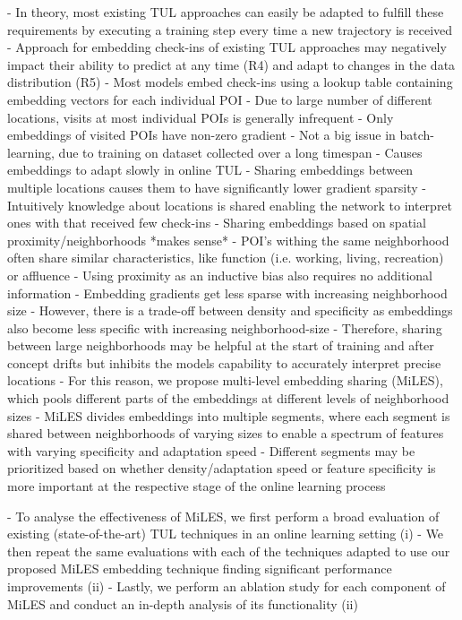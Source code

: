 \documentclass{article} %
\theoremstyle{definition}
\begin{document}
- In theory, most existing TUL approaches can easily be adapted to fulfill these requirements by executing a training step every time a new trajectory is received
- Approach for embedding check-ins of existing TUL approaches may negatively impact their ability to predict at any time (R4) and adapt to changes in the data distribution (R5)
- Most models embed check-ins using a lookup table containing embedding vectors for each individual POI
- Due to large number of different locations, visits at most individual POIs is generally infrequent \citep{chenMutualDistillationLearning2022a}
- Only embeddings of visited POIs have non-zero gradient
- Not a big issue in batch-learning, due to training on dataset collected over a long timespan
- Causes embeddings to adapt slowly in online TUL
- Sharing embeddings between multiple locations causes them to have significantly lower gradient sparsity
- Intuitively knowledge about locations is shared enabling the network to interpret ones with that received few check-ins
- Sharing embeddings based on spatial proximity/neighborhoods *makes sense*
- POI's withing the same neighborhood often share similar characteristics, like function (i.e. working, living, recreation) or affluence
- Using proximity as an inductive bias also requires no additional information
- Embedding gradients get less sparse with increasing neighborhood size
- However, there is a trade-off between density and specificity as embeddings also become less specific with increasing neighborhood-size
- Therefore, sharing between large neighborhoods may be helpful at the start of training and after concept drifts but inhibits the models capability to accurately interpret precise locations
- For this reason, we propose multi-level embedding sharing (MiLES), which pools different parts of the embeddings at different levels of neighborhood sizes
- MiLES divides embeddings into multiple segments, where each segment is shared between neighborhoods of varying sizes to enable a spectrum of features with varying specificity and adaptation speed
- Different segments may be prioritized based on whether density/adaptation speed or feature specificity is more important at the respective stage of the online learning process

- To analyse the effectiveness of MiLES, we first perform a broad evaluation of existing (state-of-the-art) TUL techniques in an online learning setting (i)
- We then repeat the same evaluations with each of the techniques adapted to use our proposed MiLES embedding technique finding significant performance improvements (ii)
- Lastly, we perform an ablation study for each component of MiLES and conduct an in-depth analysis of its functionality (ii)
\end{document}
